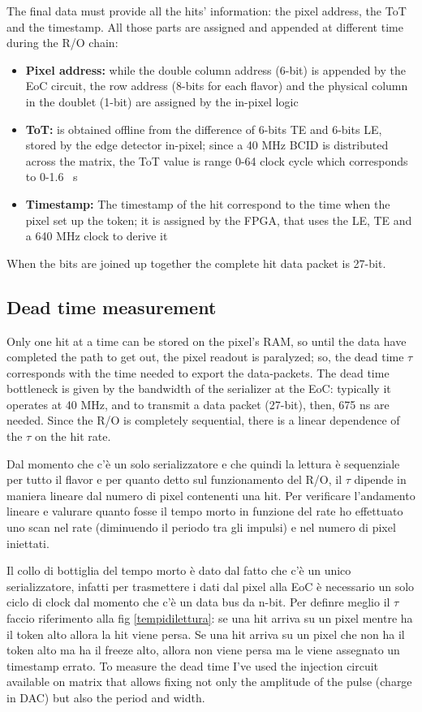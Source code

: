     
    The final data must provide all the hits' information: the pixel address, the ToT and the timestamp. All those parts are assigned and appended at different time during the R/O chain:  
    \begin{itemize}
        \item\textbf{Pixel address:} while the double column address (6-bit) is appended by the EoC circuit, the row address (8-bits for each flavor) and the physical column in the doublet (1-bit) are assigned by the in-pixel logic      
        \item \textbf{ToT:} is obtained offline from the difference of 6-bits TE and 6-bits LE, stored by the edge detector in-pixel; since a 40 MHz BCID is distributed across the matrix, the ToT value is range 0-64 clock cycle which corresponds to 0-1.6 \si{\mu s}  
        \item \textbf{Timestamp:} The timestamp of the hit correspond to the time when the pixel set up the token; it is assigned by the FPGA, that uses the LE, TE and a 640 MHz clock to derive it
    \end{itemize}
    When the bits are joined up together the complete hit data packet is 27-bit. 

    \subsection{Dead time measurement}
        Only one hit at a time can be stored on the pixel's RAM, so until the data have completed the path to get out, the pixel readout is paralyzed; so, the dead time $\tau$ corresponds with the time needed to export the data-packets. 
        The dead time bottleneck is given by the bandwidth of the serializer at the EoC: typically it operates at 40 MHz, and to transmit a data packet (27-bit), then, 675 \si{ns} are needed. 
        Since the R/O is completely sequential, there is a linear dependence of the $\tau$ on the hit rate. 
        
        
        Dal momento che c'è un solo serializzatore e che quindi la lettura è sequenziale per tutto il flavor e per quanto detto sul funzionamento del R/O, il $\tau$ dipende in maniera lineare dal numero di pixel contenenti una hit. Per verificare l'andamento lineare e valurare quanto fosse il tempo morto in funzione del rate ho effettuato uno scan nel rate (diminuendo il periodo tra gli impulsi) e nel numero di pixel iniettati. 

        Il collo di bottiglia del tempo morto è dato dal fatto che c'è un unico serializzatore, infatti per trasmettere i dati dal pixel alla EoC è necessario un solo ciclo di clock dal momento che c'è un data bus da n-bit. 
        Per definre meglio il $\tau$ faccio riferimento alla fig \ref{tempidilettura}: se una hit arriva su un pixel mentre ha il token alto allora la hit viene persa. Se una hit arriva su un pixel che non ha il token alto ma ha il freeze alto, allora non viene persa ma le viene assegnato un timestamp errato. 
        To measure the dead time I've used the injection circuit available on matrix that allows fixing not only the amplitude of the pulse (charge in DAC) but also the period and width. 

